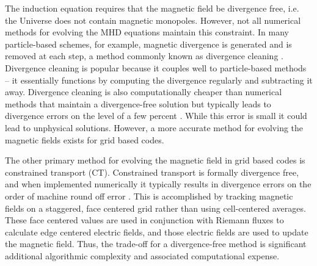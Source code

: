 The induction equation requires that the magnetic field be divergence free, i.e. the Universe does not contain magnetic monopoles. However, not all numerical methods for evolving the MHD equations maintain this constraint. In many particle-based schemes, for example, magnetic divergence is generated and is removed at each step, a method commonly known as divergence cleaning \citep{dedner_hyperbolic_2002}. Divergence cleaning is popular because it couples well to particle-based methods -- it essentially functions by computing the divergence regularly and subtracting it away. Divergence cleaning is also computationally cheaper than numerical methods that maintain a divergence-free solution but typically leads to divergence errors on the level of a few percent \citep{dedner_hyperbolic_2002, pakmor_magnetizing_2020, van_de_voort_effect_2021}. While this error is small it could lead to unphysical solutions. However, a more accurate method for evolving the magnetic fields exists for grid based codes.

The other primary method for evolving the magnetic field in grid based codes is constrained transport (CT). Constrained transport is formally divergence free, and when implemented numerically it typically results in divergence errors on the order of machine round off error \citep{evans_1988, gardiner_2005, stone_athena_2008, stone_2009, zingale_castro_2020, almgren_castro_2020}. This is accomplished by tracking magnetic fields on a staggered, face centered grid rather than using cell-centered averages. These face centered values are used in conjunction with Riemann fluxes to calculate edge centered electric fields, and those electric fields are used to update the magnetic field. Thus, the trade-off for a divergence-free method is significant additional algorithmic complexity and associated computational expense.

